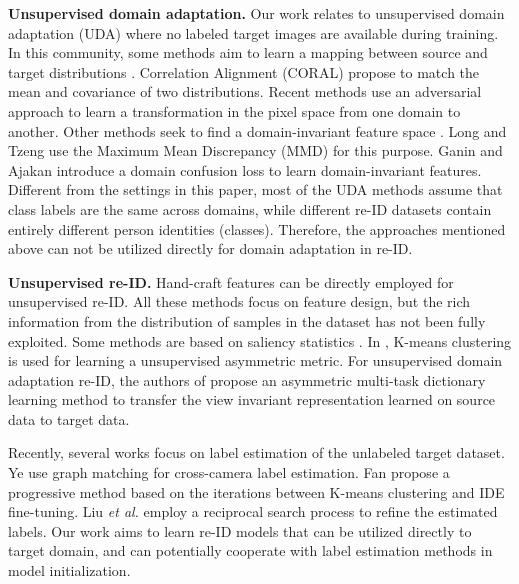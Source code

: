 \documentclass[10pt,twocolumn,letterpaper]{article}
\begin{document}
\textbf{Unsupervised domain adaptation.}
Our work relates to unsupervised domain adaptation (UDA) where no labeled target images are available during training.
In this community, some methods aim to learn a mapping between source and target distributions \cite{DBLP:conf/eccv/SaenkoKFD10, DBLP:conf/cvpr/GongSSG12,DBLP:conf/iccv/FernandoHST13, DBLP:conf/aaai/SunFS16}.  Correlation Alignment (CORAL) \cite{DBLP:conf/aaai/SunFS16} propose to match the mean and covariance of two distributions. Recent methods \cite{cycledomain, DBLP:journals/corr/BousmalisSDEK16, DBLP:conf/nips/LiuT16} use an adversarial approach to learn a transformation in the pixel space from one domain to another.
Other methods seek to find a domain-invariant feature space \cite{DBLP:journals/corr/abs-1709-10190, DBLP:conf/cvpr/LongD0SGY13, DBLP:conf/icml/GaninL15, DBLP:conf/icml/LongC0J15, DBLP:journals/corr/TzengHZSD14, DBLP:journals/jmlr/GaninUAGLLML16, DBLP:journals/corr/AjakanGLLM14}. Long \etal \cite{DBLP:conf/icml/LongC0J15} and Tzeng \etal \cite{DBLP:journals/corr/TzengHZSD14} use the Maximum Mean Discrepancy (MMD) \cite{MMD} for this purpose. Ganin \etal \cite{DBLP:journals/jmlr/GaninUAGLLML16} and Ajakan \etal \cite{DBLP:journals/corr/AjakanGLLM14} introduce a domain confusion loss to learn domain-invariant features. 
Different from the settings in this paper, most of the UDA methods assume that class labels  are the same across domains, while different re-ID datasets contain entirely different person identities (classes). Therefore, the approaches mentioned above can not be utilized directly for domain adaptation in re-ID.

\textbf{Unsupervised re-ID.}
Hand-craft features \cite{DBLP:journals/ivc/MaSJ14,DBLP:conf/eccv/GrayT08,DBLP:conf/cvpr/FarenzenaBPMC10,DBLP:conf/cvpr/MatsukawaOSS16,DBLP:conf/cvpr/LiaoHZL15,DBLP:conf/iccv/ZhengSTWWT15} can be directly employed for unsupervised re-ID. All these methods focus on feature design, but the rich information from the distribution of samples in the dataset has not been fully exploited. Some methods are based on saliency statistics \cite{DBLP:conf/cvpr/ZhaoOW13,DBLP:conf/bmvc/WangGX14}. In \cite{CAMEL}, K-means clustering is used for learning a unsupervised asymmetric metric. For unsupervised domain adaptation re-ID, the authors of \cite{DBLP:conf/cvpr/PengXWPGHT16} propose an asymmetric multi-task dictionary learning method to transfer the view invariant representation learned on source data to target data.

Recently, several works focus on label estimation of the unlabeled target dataset. Ye \etal \cite{DBLP:journals/corr/abs-1709-09297} use graph matching  for cross-camera label estimation. Fan \etal \cite{fan17unsupervised} propose a progressive method based on the iterations between K-means clustering and IDE \cite{DBLP:journals/corr/ZhengYH16} fine-tuning. Liu \emph{et al.} \cite{liu2017stepwise} employ a reciprocal search process to refine the estimated labels. Our work aims to learn re-ID models that can be utilized directly  to target domain, and can potentially cooperate with label estimation methods in model initialization.
\end{document}
